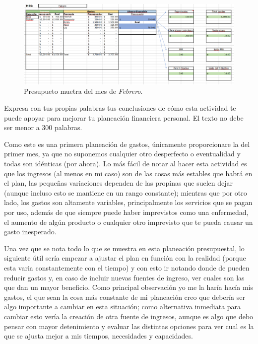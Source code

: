 \documentclass[11pt]{article}
\title{\titulo}
\author{ Universidad Virtual del Estado de Guanajuato \textbf{UVEG} \\ 
\materia \\ Benjamín Rivera \\ 19015478 }
\date{\textit{Fecha de entrega:} \today}
\begin{document}
	\maketitle
	
	\begin{figure}[htp]
		\centering
		\includegraphics[width=1.1\textwidth]{assets/R5_U3.png}
		\caption{Presupueto muetra del mes de \textit{Febrero}.}
		\label{Capturas}
	\end{figure}
	
	Expresa  con  tus  propias  palabras  tus  conclusiones  de  cómo  esta  actividad  te  puede apoyar para mejorar tu planeación financiera personal. El texto no debe ser menor a 300 palabras.
	
	\par Como este es una primera planeación de gastos, únicamente proporcionare la del primer mes, ya que no suponemos cualquier otro desperfecto o eventualidad y todas son idénticas (por ahora). Lo más fácil de notar al hacer esta actividad es que los ingresos (al menos en mi caso) son de las cosas más estables que habrá en el plan, las pequeñas variaciones dependen de las propinas que suelen dejar (aunque incluso esto se mantiene en un rango constante); mientras que por otro lado, los gastos son altamente variables, principalmente los servicios que se pagan por uso, además de que siempre puede haber imprevistos como una enfermedad, el aumento de algún producto o cualquier otro imprevisto que te pueda causar un gasto inesperado.
	
	\par Una vez que se nota todo lo que se muestra en esta planeación presupuestal, lo siguiente útil sería empezar a ajustar el plan en función con la realidad (porque esta varia constantemente con el tiempo) y con esto ir notando donde de pueden reducir gastos y, en caso de incluir nuevas fuentes de ingreso, ver cuales son las que dan un mayor beneficio. Como principal observación yo me la haría hacía mis gastos, el que sean la cosa más constante de mi planeación creo que debería ser algo importante a cambiar en esta situación; como alternativa inmediata para cambiar esto vería la creación de otra fuente de ingresos, aunque es algo que debo pensar con mayor detenimiento y evaluar las distintas opciones para ver cual es la que se ajusta mejor a mis tiempos, necesidades y capacidades.
	
\end{document}
